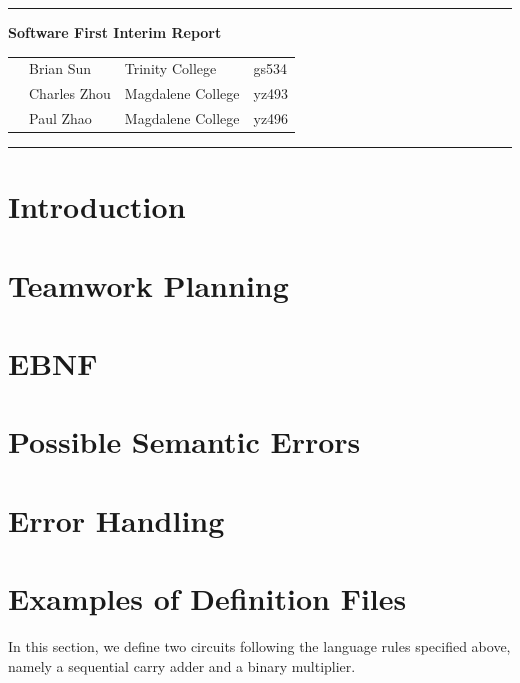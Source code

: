 \documentclass[12pt]{article}
\begin{document}
\vspace{0.3cm}
\rule{15.7cm}{0.5mm}


\begin{center}
{\hspace{0.6cm}\Large \textbf {Software First Interim Report}\\
}
\end{center}
\begin{table}[H]
\centering
\begin{tabular}{ p{1.5cm}p{5cm}p{6cm} p{6cm}} 
&Brian Sun & Trinity College & gs534 \\ 
&Charles Zhou & Magdalene College & yz493 \\ 
&Paul Zhao & Magdalene College & yz496 \\ 
\end{tabular}
\end{table}


\begin{center}
\rule{15.7cm}{0.5mm}
\end{center}

\section{Introduction}
\section{Teamwork Planning}
\section{EBNF}
\section{Possible Semantic Errors}
\section{Error Handling}











\section{Examples of Definition Files}
In this section, we define two circuits following the language rules specified above, namely a sequential carry adder and a binary multiplier.
\end{document}

